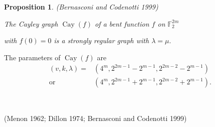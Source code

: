 \documentclass[pdf,sprung,slideColor,nocolorBG]{beamer}
\newenvironment{colortheme}[1]{
\def\ProvidesPackageRCS $##1${\relax}
\renewcommand{\ProcessOptions}{\relax}
\makeatletter

\makeatother
}{}
\newcommand{\slidecite}[1]{\tiny{(#1)}\normalsize{}}
\newcommand{\smallcite}[1]{\small{(#1)}\normalsize{}}
\newcommand{\mb}[1]{\mathbb{#1}}
\newcommand{\Emph}[1]{\emph{\textcolor{blue}{#1}}}
\newcommand{\To}{\rightarrow}
\newcommand{\Cay}[1]{\operatorname{Cay}\left(#1\right)}
\newcommand{\support}[1]{\operatorname{supp}\left(#1\right)}
\newcommand{\weight}[1]{\operatorname{wt}\left(#1\right)}
\newcommand{\F}{\mb{F}}
\newtheorem{Def}{Definition}
\newtheorem{Proposition}{Proposition}
\begin{document}
\begin{colortheme}{seagull}
\begin{frame}
\begin{Proposition}
\smallcite{Bernasconi and Codenotti 1999}

The Cayley graph $\Cay{f}$ of a bent function $f$ on $\F_2^{2m}$

with $f(0)=0$ is a strongly regular graph with $\lambda = \mu.$
\end{Proposition}

The parameters of $\Cay{f}$ are
\begin{align*}
(v,k,\lambda) = &(4^m, 2^{2 m - 1} - 2^{m-1}, 2^{2 m - 2} - 2^{m-1})
\\
  \text{or} \quad &(4^m, 2^{2 m - 1} + 2^{m-1}, 2^{2 m - 2} + 2^{m-1}).
\end{align*}

~

\slidecite{Menon 1962; Dillon 1974; Bernasconi and Codenotti 1999}
\end{frame}
%
%
%
%
%
%
%
%
%
%
%
%
%

\end{colortheme}
\end{document}
